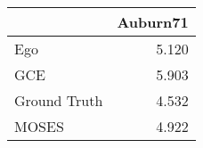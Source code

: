 \begin{tabular}{lr}
\toprule
{} & Auburn71 \\
\midrule
Ego          &    5.120 \\
GCE          &    5.903 \\
Ground Truth &    4.532 \\
MOSES        &    4.922 \\
\bottomrule
\end{tabular}
